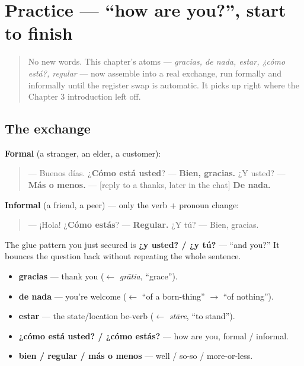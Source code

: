 \section[Practice]{Practice — \textquotedblleft{}how are you?\textquotedblright{}, start to finish}

\label{lesson:ES-C04-practice}



\begin{quote}
No new words. This chapter's atoms — \emph{gracias, de nada, estar, ¿cómo está?, regular} — now assemble into a real exchange, run formally and informally until the register swap is automatic. It picks up right where the Chapter 3 introduction left off.
\end{quote}

\subsection*{The exchange}
\textbf{Formal} (a stranger, an elder, a customer):

\begin{quote}
— Buenos días. ¿\textbf{Cómo está usted}? — \textbf{Bien, gracias.} ¿Y usted? — \textbf{Más o menos.} — {[}reply to a thanks, later in the chat{]} \textbf{De nada.}
\end{quote}

\textbf{Informal} (a friend, a peer) — only the verb + pronoun change:

\begin{quote}
— ¡Hola! ¿\textbf{Cómo estás}? — \textbf{Regular.} ¿Y tú? — Bien, gracias.
\end{quote}

The glue pattern you just secured is \textbf{¿y usted? / ¿y tú?} — “and you?” It bounces the question back without repeating the whole sentence.

\begin{grammarlens}[title={What you've built this chapter}]
\begin{itemize}
\raggedright
  \item \textbf{gracias} — thank you ($\leftarrow$ \emph{grātia}, \textquotedblleft{}grace\textquotedblright{}).
  \item \textbf{de nada} — you're welcome ($\leftarrow$ \textquotedblleft{}of a born-thing\textquotedblright{} $\to$ \textquotedblleft{}of nothing\textquotedblright{}).
  \item \textbf{estar} — the state/location be-verb ($\leftarrow$ \emph{stāre}, “to stand”).
  \item \textbf{¿cómo está usted? / ¿cómo estás?} — how are you, formal / informal.
  \item \textbf{bien / regular / más o menos} — well / so-so / more-or-less.
\end{itemize}
\end{grammarlens}


